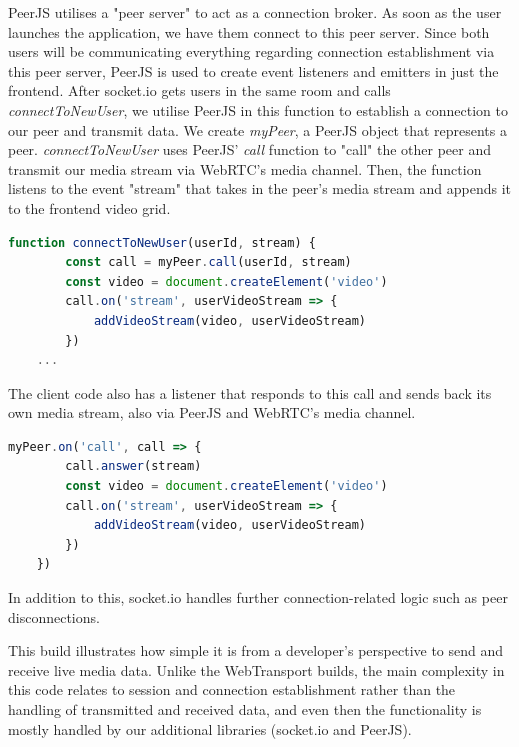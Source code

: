 PeerJS utilises a "peer server" to act as a connection broker. As soon as the user launches the application, we have them connect to this peer server. Since both users will be communicating everything regarding connection establishment via this peer server, PeerJS is used to create event listeners and emitters in just the frontend. 
After socket.io gets users in the same room and calls \textit{connectToNewUser}, we utilise PeerJS in this function to establish a connection to our peer and transmit data. We create \textit{myPeer}, a PeerJS object that represents a peer. \textit{connectToNewUser} uses PeerJS' \textit{call} function to "call" the other peer and transmit our media stream via WebRTC's media channel. Then, the function listens to the event "stream" that takes in the peer's media stream and appends it to the frontend video grid.

\begin{lstlisting}[language=javascript, caption={Connection establishment and data transmission via PeerJS and WebRTC.}, label=lst:callahan]
    function connectToNewUser(userId, stream) {
        const call = myPeer.call(userId, stream)
        const video = document.createElement('video')
        call.on('stream', userVideoStream => {
            addVideoStream(video, userVideoStream)
        })
    ...
\end{lstlisting}

The client code also has a listener that responds to this call and sends back its own media stream, also via PeerJS and WebRTC's media channel.

\begin{lstlisting}[language=javascript, caption={Responding to the connection establishment, receiving media data and transmitting media data back via WebRTC.}, label=lst:callahan]
    myPeer.on('call', call => {
        call.answer(stream)
        const video = document.createElement('video')
        call.on('stream', userVideoStream => {
            addVideoStream(video, userVideoStream)
        })
    })
\end{lstlisting}

In addition to this, socket.io handles further connection-related logic such as peer disconnections.  

This build illustrates how simple it is from a developer's perspective to send and receive live media data. Unlike the WebTransport builds, the main complexity in this code relates to session and connection establishment rather than the handling of transmitted and received data, and even then the functionality is mostly handled by our additional libraries (socket.io and PeerJS). 

